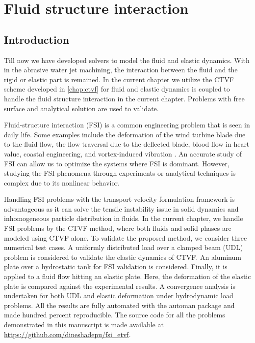 \chapter{Fluid structure interaction}\label{chap:fsi}
\section{Introduction}
Till now we have developed solvers to model the fluid and elastic dynamics. With
in the abrasive water jet machining, the interaction between the fluid and the
rigid or elastic part is remained. In the current chapter we utilize the CTVF
scheme developed in \cref{chap:ctvf} for fluid and elastic dynamics is coupled to
handle the fluid structure interaction in the current chapter. Problems with
free surface and analytical solution are used to validate.


Fluid-structure interaction (FSI) is a common engineering problem that is seen
in daily life. Some examples include the deformation of the wind turbine blade
due to the fluid flow, the flow traversal due to the deflected blade, blood flow
in heart value, coastal engineering, and vortex-induced vibration
\citep{williamson2004vortex,bearman2011circular}. An accurate study of FSI can
allow us to optimize the systems where FSI is dominant. However, studying the
FSI phenomena through experiments or analytical techniques is complex due to its
nonlinear behavior. %



Handling FSI problems with the transport velocity formulation framework is
advantageous as it can solve the tensile instability issue in solid dynamics and
inhomogeneous particle distribution in fluids. In the current chapter, we handle
FSI problems by the CTVF method, where both fluids and solid phases are modeled
using CTVF alone. To validate the proposed method, we consider three numerical
test cases. A uniformly distributed load over a clamped beam (UDL) problem is
considered to validate the elastic dynamics of CTVF. An aluminum plate over a
hydrostatic tank for FSI validation is considered. Finally, it is applied to a
fluid flow hitting an elastic plate. Here, the deformation of the elastic plate
is compared against the experimental results. A convergence analysis is
undertaken for both UDL and elastic deformation under hydrodynamic load
problems. All the results are fully automated with the automan package
\citep{automan2018} and made hundred percent reproducible. The source code for
all the problems demonstrated in this manuscript is made available at
\url{https://github.com/dineshadepu/fsi_etvf}.

